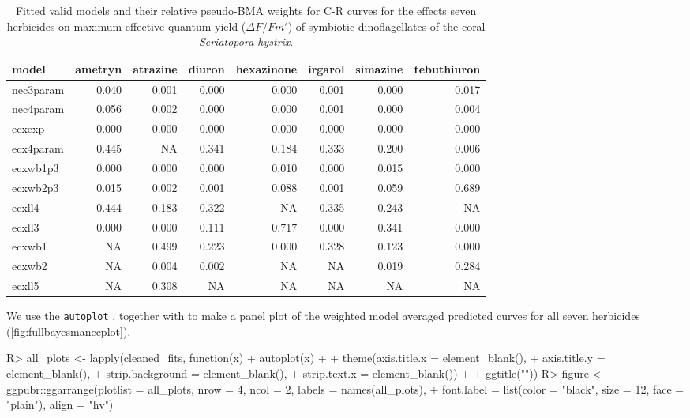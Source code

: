 \documentclass[
  shortnames]{jss}
\begin{document}
\begin{CodeChunk}
\begin{table}

\caption{\label{tab:weightsTab}Fitted valid models and their relative pseudo-BMA weights for C-R curves for the effects seven herbicides on maximum effective quantum yield ($\Delta F / Fm'$) of symbiotic dinoflagellates of the coral \textit{Seriatopora hystrix}.}
\centering
\begin{tabular}[t]{l|r|r|r|r|r|r|r}
\hline
model & ametryn & atrazine & diuron & hexazinone & irgarol & simazine & tebuthiuron\\
\hline
nec3param & 0.040 & 0.001 & 0.000 & 0.000 & 0.001 & 0.000 & 0.017\\
\hline
nec4param & 0.056 & 0.002 & 0.000 & 0.000 & 0.001 & 0.000 & 0.004\\
\hline
ecxexp & 0.000 & 0.000 & 0.000 & 0.000 & 0.000 & 0.000 & 0.000\\
\hline
ecx4param & 0.445 & NA & 0.341 & 0.184 & 0.333 & 0.200 & 0.006\\
\hline
ecxwb1p3 & 0.000 & 0.000 & 0.000 & 0.010 & 0.000 & 0.015 & 0.000\\
\hline
ecxwb2p3 & 0.015 & 0.002 & 0.001 & 0.088 & 0.001 & 0.059 & 0.689\\
\hline
ecxll4 & 0.444 & 0.183 & 0.322 & NA & 0.335 & 0.243 & NA\\
\hline
ecxll3 & 0.000 & 0.000 & 0.111 & 0.717 & 0.000 & 0.341 & 0.000\\
\hline
ecxwb1 & NA & 0.499 & 0.223 & 0.000 & 0.328 & 0.123 & 0.000\\
\hline
ecxwb2 & NA & 0.004 & 0.002 & NA & NA & 0.019 & 0.284\\
\hline
ecxll5 & NA & 0.308 & NA & NA & NA & NA & NA\\
\hline
\end{tabular}
\end{table}

\end{CodeChunk}

We use the  \texttt{autoplot} , together with  to make a panel plot of the weighted model averaged predicted curves for all seven herbicides (\autoref{fig:fullbayesmanecplot}).

\begin{CodeChunk}
\begin{CodeInput}
R> all_plots <- lapply(cleaned_fits, function(x) {
+   autoplot(x) +
+   theme(axis.title.x = element_blank(),
+          axis.title.y = element_blank(),
+          strip.background = element_blank(),
+          strip.text.x = element_blank()) +
+     ggtitle("")})
R> figure <- ggpubr::ggarrange(plotlist = all_plots, nrow = 4, ncol = 2, labels = names(all_plots),
+   font.label = list(color = "black", size = 12, face = "plain"), align = "hv")
\end{CodeInput}
\end{CodeChunk}
\end{document}
